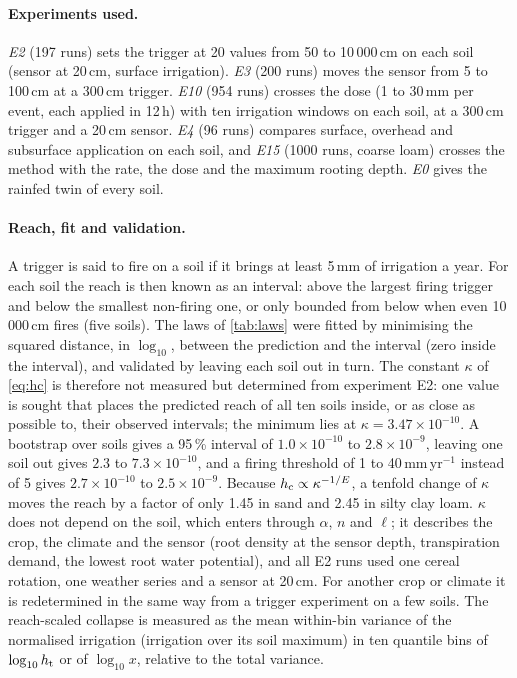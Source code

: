 



\paragraph{Experiments used.}
\emph{E2} (197 runs) sets the trigger at 20 values from 50 to 10\,000\,cm on each soil (sensor at 20\,cm, surface irrigation). \emph{E3} (200 runs) moves the sensor from 5 to 100\,cm at a 300\,cm trigger. \emph{E10} (954 runs) crosses the dose (1 to 30\,mm per event, each applied in 12\,h) with ten irrigation windows on each soil, at a 300\,cm trigger and a 20\,cm sensor. \emph{E4} (96 runs) compares surface, overhead and subsurface application on each soil, and \emph{E15} (1000 runs, coarse loam) crosses the method with the rate, the dose and the maximum rooting depth. \emph{E0} gives the rainfed twin of every soil.

\paragraph{Reach, fit and validation.}
A trigger is said to fire on a soil if it brings at least 5\,mm of irrigation a year. For each soil the reach is then known as an interval: above the largest firing trigger and below the smallest non-firing one, or only bounded from below when even 10\,000\,cm fires (five soils). The laws of \cref{tab:laws} were fitted by minimising the squared distance, in $\log_{10}$, between the prediction and the interval (zero inside the interval), and validated by leaving each soil out in turn. The constant $\kappa$ of \cref{eq:hc} is therefore not measured but determined from experiment E2: one value is sought that places the predicted reach of all ten soils inside, or as close as possible to, their observed intervals; the minimum lies at $\kappa=3.47\times10^{-10}$. A bootstrap over soils gives a 95\,\% interval of $1.0\times10^{-10}$ to $2.8\times10^{-9}$, leaving one soil out gives $2.3$ to $7.3\times10^{-10}$, and a firing threshold of 1 to 40\,mm\,yr$^{-1}$ instead of 5 gives $2.7\times10^{-10}$ to $2.5\times10^{-9}$. Because $h_{\mathrm{c}}\propto\kappa^{-1/E}$, a tenfold change of $\kappa$ moves the reach by a factor of only 1.45 in sand and 2.45 in silty clay loam. $\kappa$ does not depend on the soil, which enters through $\alpha$, $n$ and $\ell$; it describes the crop, the climate and the sensor (root density at the sensor depth, transpiration demand, the lowest root water potential), and all E2 runs used one cereal rotation, one weather series and a sensor at 20\,cm. For another crop or climate it is redetermined in the same way from a trigger experiment on a few soils. The reach-scaled collapse is measured as the mean within-bin variance of the normalised irrigation (irrigation over its soil maximum) in ten quantile bins of $\log_{10}h_{\mathrm{t}}$ or of $\log_{10}x$, relative to the total variance.

